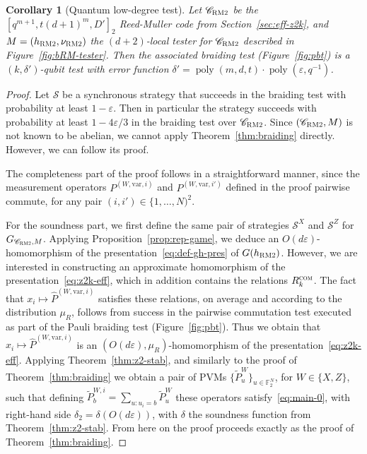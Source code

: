\documentclass[11pt]{article}
\newtheorem{corollary}[theorem]{Corollary}
\theoremstyle{definition}
\newcommand{\code}{\mathscr{C}}
\newcommand{\strategy}{\mathscr{S}}
\newcommand{\F}{\ensuremath{\mathbb{F}}}
\newcommand{\com}{\textsc{com}}
\newcommand{\bRM}{\ensuremath{\textsc{RM2}}}
\DeclareMathOperator{\poly}{poly}
\newcommand{\eps}{\varepsilon}
\newcommand{\var}{\mathrm{var}}
\begin{document}
\begin{corollary}[Quantum low-degree test]\label{cor:qld}
Let $\code_\bRM$ be the $[q^{m+1},t(d+1)^m,D']_2$ Reed-Muller code from Section~\ref{sec:eff-z2k}, and $M=(h_\bRM,\nu_\bRM)$ the $(d+2)$-local tester for $\code_\bRM$ described in Figure~\ref{fig:bRM-tester}. Then the associated braiding test (Figure~\ref{fig:pbt}) is a $(k,\delta')$-qubit test with error function $\delta' = \poly(m,d,t)\cdot\poly(\eps,q^{-1})$.
\end{corollary}

\begin{proof}
Let $\strategy$ be a synchronous strategy that succeeds in the braiding test with probability at least $1-\eps$. Then in particular the strategy succeeds with probability at least $1-4\eps/3$ in the braiding test over $\code_\bRM$. Since $(\code_\bRM,M)$ is not known to be abelian, we cannot apply Theorem~\ref{thm:braiding} directly. However, we can follow its proof. 

The completeness part of the proof follows in a straightforward manner, since the measurement operators $P^{(W,\var,i)}$ and $P^{(W,\var,i')}$ defined in the proof pairwise commute, for any pair $(i,i')\in \{1,\ldots,N)^2$. 

For the soundness part, we first define the same pair of strategies $\strategy^X$ and $\strategy^Z$ for $G_{\code_\bRM,M}$. Applying Proposition~\ref{prop:rep-game}, we deduce an $O(d\eps)$-homomorphism of the presentation~\eqref{eq:def-gh-pres} of $G(h_\bRM)$. However, we are interested in constructing an approximate homomorphism of the presentation~\eqref{eq:z2k-eff}, which in addition contains the relations $R_k^\com$. The fact that $x_i \mapsto \widehat{P}^{(W,\var,i)}$ satisfies these relations, on average and according to the distribution $\mu_R$, follows from success in the pairwise commutation test executed as part of the Pauli braiding test (Figure~\ref{fig:pbt}). Thus we obtain that $x_i \mapsto \widehat{P}^{(W,\var,i)}$ is an $(O(d\eps),\mu_R)$-homomorphism of the presentation~\eqref{eq:z2k-eff}. Applying Theorem~\ref{thm:z2-stab}, and similarly to the proof of Theorem~\ref{thm:braiding} we obtain a pair of PVMs $\{\tilde{P}^W_u\}_{u\in\F_2^N}$, for $W\in\{X,Z\}$, such that defining $\tilde{P}^{W,i}_b = \sum_{u:u_i=b} \tilde{P}^W_u$ these operators satisfy~\eqref{eq:main-0}, with right-hand side $\delta_2 = \delta(O(d\eps))$, with $\delta$ the soundness function from Theorem~\ref{thm:z2-stab}. From here on the proof proceeds exactly as the proof of Theorem~\ref{thm:braiding}. 
\end{proof}
\end{document}
